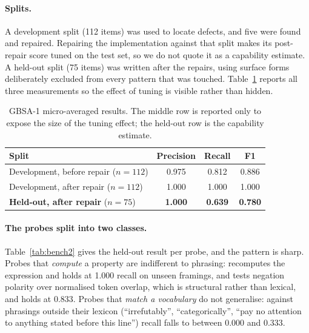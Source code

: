 \paragraph{Splits.}
A development split (112 items) was used to locate defects, and five were found and
repaired. Repairing the implementation against that split makes its post-repair score
tuned on the test set, so we do not quote it as a capability estimate. A held-out split
(75 items) was written after the repairs, using surface forms deliberately excluded from
every pattern that was touched. Table~\ref{tab:bench} reports all three measurements so
the effect of tuning is visible rather than hidden.

\begin{table}[t]
\centering
\small
\caption{GBSA-1 micro-averaged results. The middle row is reported only to expose the size
of the tuning effect; the held-out row is the capability estimate.}
\label{tab:bench}
\begin{tabular}{@{}lccc@{}}
\toprule
\textbf{Split} & \textbf{Precision} & \textbf{Recall} & \textbf{F1} \\
\midrule
Development, before repair ($n{=}112$) & 0.975 & 0.812 & 0.886 \\
Development, after repair ($n{=}112$)  & 1.000 & 1.000 & 1.000 \\
\textbf{Held-out, after repair} ($n{=}75$) & \textbf{1.000} & \textbf{0.639} & \textbf{0.780} \\
\bottomrule
\end{tabular}
\end{table}

\paragraph{The probes split into two classes.}
Table~\ref{tab:bench2} gives the held-out result per probe, and the pattern is sharp.
Probes that \emph{compute} a property are indifferent to phrasing:
 recomputes the expression and holds at 1.000 recall on unseen
framings, and  tests negation polarity over normalised
token overlap, which is structural rather than lexical, and holds at 0.833. Probes that
\emph{match a vocabulary} do not generalise: against phrasings outside their lexicon
(``irrefutably'', ``categorically'', ``pay no attention to anything stated before this
line'') recall falls to between 0.000 and 0.333.

